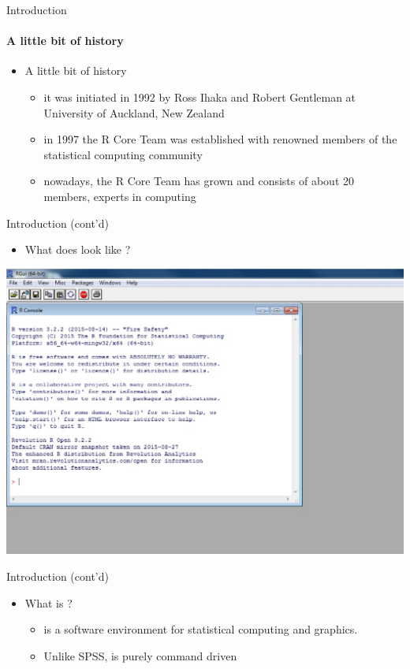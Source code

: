 \documentclass[14pt, aspectratio=169, sectionpage=simple, xclolor=table]{beamer}
\begin{document}
\begin{frame}{ Introduction}
\framesubtitle{A little bit of history}
\begin{itemize}
	\item A little bit of history
	\begin{itemize}
		\item it was initiated in 1992 by Ross Ihaka and Robert
		Gentleman at University of Auckland, New Zealand
		\item in 1997 the R Core Team was established with renowned
		members of the statistical computing community
		\item nowadays, the R Core Team has grown and consists of
		about 20 members, experts in computing
	\end{itemize}
\end{itemize}
\end{frame}
\begin{frame}[fragile]{ Introduction (cont'd)}
\begin{itemize}
	\item What does \R look like ?
\end{itemize}
\includegraphics[height=0.6\textheight]{Figures/R.eps}  
\end{frame}
\begin{frame}[fragile]{Introduction (cont'd)}
\begin{itemize}
	\item What is \R ?
	\begin{itemize}
		\item is a software environment for statistical computing and graphics.
		\item Unlike SPSS, \R is purely command driven
	\end{itemize}
\end{itemize}
\end{frame}
\end{document}
